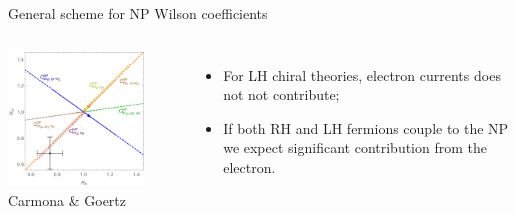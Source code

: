 \documentclass[9pt,usenames,dvipsnames]{beamer}
\begin{document}
\begin{frame}{General scheme for NP Wilson coefficients  }
	\begin{columns}[c]
		\begin{center}
			\includegraphics[width=0.8\textwidth]{./assets/RKRKs} \\{\tiny Carmona \& Goertz }  
		\end{center}
		\begin{itemize}
			\item For LH chiral theories, electron currents does not not contribute;
			\item If  both RH and LH fermions couple to the NP we expect significant contribution from the electron.
		\end{itemize} 
	\end{columns}
\end{frame}
\end{document}
